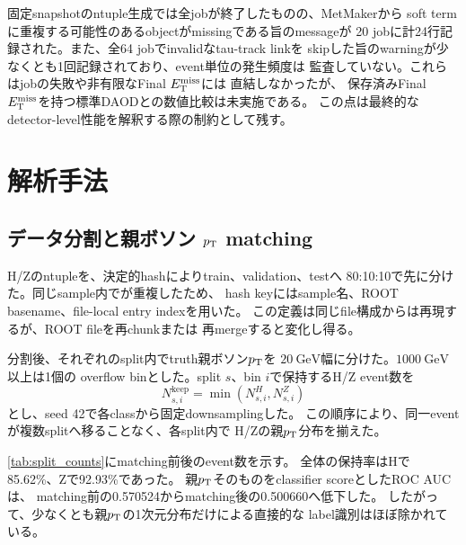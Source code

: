 \documentclass[xelatex,ja=standard,a4paper,10pt,twocolumn]{bxjsarticle}
\begin{document}
固定snapshotのntuple生成では全jobが終了したものの、MetMakerから
soft termに重複する可能性のあるobjectがmissingである旨のmessageが
20 jobに計24行記録された。また、全64 jobでinvalidなtau-track linkを
skipした旨のwarningが少なくとも1回記録されており、event単位の発生頻度は
監査していない。これらはjobの失敗や非有限なFinal \(E_{\mathrm{T}}^{\mathrm{miss}}\)には
直結しなかったが、
保存済みFinal \(E_{\mathrm{T}}^{\mathrm{miss}}\)を持つ標準DAODとの数値比較は未実施である。
この点は最終的なdetector-level性能を解釈する際の制約として残す。

\section{解析手法}
\label{sec:method}

\subsection{データ分割と親ボソン \(p_{\mathrm{T}}\) matching}
\label{subsec:matching}

H/Zのntupleを、決定的hashによりtrain、validation、testへ
80:10:10で先に分けた。同じsample内でが重複したため、
hash keyにはsample名、ROOT basename、file-local entry indexを用いた。
この定義は同じfile構成からは再現するが、ROOT fileを再chunkまたは
再mergeすると変化し得る。

分割後、それぞれのsplit内でtruth親ボソン\(p_{\mathrm{T}}\)を
\(\SI{20}{\GeV}\)幅に分けた。\(\SI{1000}{\GeV}\)以上は1個の
overflow binとした。split \(s\)、bin \(i\)で保持するH/Z event数を
\begin{equation}
  N^{\mathrm{keep}}_{s,i}
  = \min\left(N^{H}_{s,i},N^{Z}_{s,i}\right)
  \label{eq:pt_matching}
\end{equation}
とし、seed 42で各classから固定downsamplingした。
この順序により、同一eventが複数splitへ移ることなく、各split内で
H/Zの親\(p_{\mathrm{T}}\)分布を揃えた。

\cref{tab:split_counts}にmatching前後のevent数を示す。
全体の保持率はHで85.62\%、Zで92.93\%であった。
親\(p_{\mathrm{T}}\)そのものをclassifier scoreとしたROC AUCは、
matching前の0.570524からmatching後の0.500660へ低下した。
したがって、少なくとも親\(p_{\mathrm{T}}\)の1次元分布だけによる直接的な
label識別はほぼ除かれている。
\end{document}
